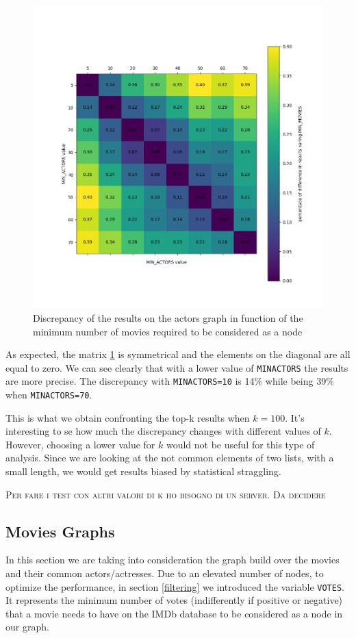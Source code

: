\begin{figure}[h!]
    \centering
    \includegraphics[width=11.5cm]{Figure_1.png}
    \caption{Discrepancy of the results on the actors graph in function of the minimum number of movies required to be considered as a node}
    \label{fig:matrix-a}
\end{figure}

\nd As expected, the matrix \ref{fig:matrix-a} is symmetrical and the elements on the diagonal are all equal to zero. We can see clearly that with a lower value of \texttt{MIN\textunderscore ACTORS} the results are more precise. The discrepancy with \texttt{MIN\textunderscore ACTORS=10} is 14\% while being 39\% when \texttt{MIN\textunderscore ACTORS=70}. \s

\nd This is what we obtain confronting the top-k results when $k=100$. It's interesting to se how much the discrepancy changes with different values of $k$. However, choosing a lower value for $k$ would not be useful for this type of analysis. Since we are looking at the not common elements of two lists, with a small length, we would get results biased by statistical straggling. \s

\textsc{Per fare i test con altri valori di k ho bisogno di un server. Da decidere}

\s
\newpage
\subsection{Movies Graphs}
In this section we are taking into consideration the graph build over the movies and their common actors/actresses. Due to an elevated number of nodes, to optimize the performance, in section \ref{filtering} we introduced the variable \texttt{VOTES}. It represents the minimum number of votes (indifferently if positive or negative) that a movie needs to have on the IMDb database to be considered as a node in our graph.

